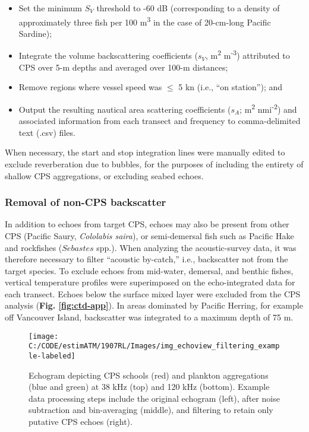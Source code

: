 \documentclass[]{article}
\begin{document}
\begin{itemize}
\item
  Set the minimum \(S_V\) threshold to -60 dB (corresponding to a density of approximately three fish per 100 m\textsuperscript{3} in the case of 20-cm-long Pacific Sardine);
\item
  Integrate the volume backscattering coefficients (\(s_V\), m\textsuperscript{2} m\textsuperscript{-3}) attributed to CPS over 5-m depths and averaged over 100-m distances;
\item
  Remove regions where vessel speed was \(\leq\) 5 kn (i.e., ``on station''); and
\item
  Output the resulting nautical area scattering coefficients (\(s_A\); m\textsuperscript{2} nmi\textsuperscript{-2}) and associated information from each transect and frequency to comma-delimited text (.csv) files.
\end{itemize}

When necessary, the start and stop integration lines were manually edited to exclude reverberation due to bubbles, for the purposes of including the entirety of shallow CPS aggregations, or excluding seabed echoes.

\hypertarget{methods-backscatter-removal}{%
\subsubsection{Removal of non-CPS backscatter}\label{methods-backscatter-removal}}

In addition to echoes from target CPS, echoes may also be present from other CPS (Pacific Saury, \emph{Cololabis saira}), or semi-demersal fish such as Pacific Hake and rockfishes (\(Sebastes\) spp.). When analyzing the acoustic-survey data, it was therefore necessary to filter ``acoustic by-catch,'' i.e., backscatter not from the target species. To exclude echoes from mid-water, demersal, and benthic fishes, vertical temperature profiles were superimposed on the echo-integrated data for each transect. Echoes below the surface mixed layer were excluded from the CPS analysis (\textbf{Fig. \ref{fig:ctd-app}}). In areas dominated by Pacific Herring, for example off Vancouver Island, backscatter was integrated to a maximum depth of 75 m.



\begin{figure}[H]

{\centering \texttt{[image: C:/CODE/estimATM/1907RL/Images/img\_echoview\_filtering\_example-labeled]} 

}

\caption{Echogram depicting CPS schools (red) and plankton aggregations (blue and green) at 38 kHz (top) and 120 kHz (bottom). Example data processing steps include the original echogram (left), after noise subtraction and bin-averaging (middle), and filtering to retain only putative CPS echoes (right).}\label{fig:ev-filtering-example}
\end{figure}
\end{document}
